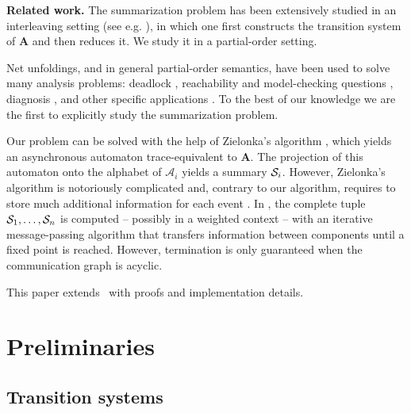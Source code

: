 \documentclass{llncs}
\def\A{\mathcal{A}}
\def\prod{\mathbf{A}}
\def\S{\mathcal{S}}
\renewcommand{\S}{{\cal S}}
\begin{document}
{\bf Related work.} The summarization problem has been extensively studied in an 
interleaving setting (see e.g. \cite{GrafS90,Valmari96,zaraket2005scalable}), in which one 
first constructs the transition system of $\prod$ and then reduces it. 
We study it in a partial-order setting.

Net unfoldings, and in general partial-order semantics, have been used to solve many analysis problems: deadlock \cite{Mcmillan95,Khomenko00}, 
reachability and model-checking questions \cite{Esparza96,Couvreur00,Khomenko03b,Esparza08,Baldan12}, diagnosis 
\cite{Fabre05}, and other specific applications \cite{Khomenko06,Hickmott07}. To the best of our knowledge 
we are the first to explicitly study the summarization problem. 

Our problem can be solved with the help of Zielonka's algorithm \cite{Zielonka87,Mukund94,Genest10}, which yields 
an asynchronous automaton trace-equivalent to $\prod$. The projection of this automaton onto the alphabet of $\A_i$ 
yields a summary $\S_i$. However, Zielonka's algorithm is notoriously complicated and, contrary to our algorithm, 
requires to store much additional information for each event \cite{Mukund94}. 
In \cite{Fabre09},  the complete tuple $\S_1, \ldots, \S_n$ is computed -- possibly in a weighted context -- with an iterative message-passing algorithm that 
transfers information between components until a fixed point is reached. However, termination
is only guaranteed when the communication graph is acyclic.

This paper extends~\cite{Esparza13} with proofs and implementation details.

\section{Preliminaries}

\subsection{Transition systems}
\end{document}
